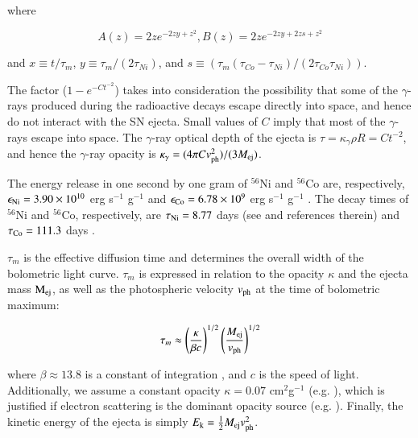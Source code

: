\documentclass[traditabstract,longauth]{aa}
\begin{document}
\begin{appendix}
\noindent where 


\begin{center}
\begin{equation}
\label{equ:bol2}
A(z)=2ze^{-2zy+z^2}, B(z)=2ze^{-2zy+2zs+z^2} 
\end{equation} 
\end{center}


\noindent and $x\equiv t/\tau_{m}$, $y\equiv \tau_{m}/(2\tau_{Ni})$, and $s\equiv (\tau_{m}(\tau_{Co}-\tau_{Ni})/(2\tau_{Co}\tau_{Ni}))$.  

The factor ($1-e^{-Ct^{-2}}$) takes into consideration the possibility that some of the $\gamma$-rays produced during the radioactive decays escape directly into space, and hence do not interact with the SN ejecta.  Small values of $C$ imply that most of the $\gamma$-rays escape into space.  The $\gamma$-ray optical depth of the ejecta is $\tau = \kappa_{\gamma} \rho R = Ct^{-2}$, and hence the $\gamma$-ray opacity is $\kappa_{\gamma} = (4\pi C v_{\rm ph}^2) / (3 M_{\rm ej})$.


The energy release in one second by one gram of $^{56}$Ni and $^{56}$Co are, respectively, $\epsilon_{\rm Ni}=3.90 \times 10^{10}$ erg s$^{-1}$ g$^{-1}$ and $\epsilon_{\rm Co}=6.78 \times 10^{9}$ erg s$^{-1}$ g$^{-1}$ \citep{Sutherland84,Cappellaro97}.  The decay times of $^{56}$Ni and $^{56}$Co, respectively, are $\tau_{\rm Ni}=8.77$ days (see \citealt{Taubenberger06} and references therein) and  $\tau_{\rm Co}=111.3$ days \citep{Martin87}.  

$\tau_{m}$ is the effective diffusion time and determines the overall width of the bolometric light curve.  $\tau_{m}$ is expressed in relation to the  opacity $\kappa$ and the ejecta mass $\rm{M_{ej}}$, as well as the photospheric velocity ${v_{\rm ph}}$ at the time of bolometric maximum:

\begin{center}
\begin{equation}
\label{equ:tau} 
\tau_{m} \approx \left(\frac{\kappa}{\beta c}\right)^{1/2} \left(\frac{{M_{\rm ej}}}{{v_{\rm ph}}}\right)^{1/2}
\end{equation} 
\end{center}
%
\noindent where $\beta \approx 13.8$ is a constant of integration \citep{Arnett1982}, and $c$ is the speed of light. Additionally, we assume a constant opacity $\kappa=0.07$ cm$^{2}$g$^{-1}$ (e.g. \citealt{Chugai00}), which is justified if electron scattering is the dominant opacity source (e.g. \citealt{Chevalier92}).  Finally, the kinetic energy of the ejecta is simply ${E_{\rm k}} = \frac{1}{2} M_{\rm ej} v_{\rm ph}^{2}$.






\end{appendix}
\end{document}
